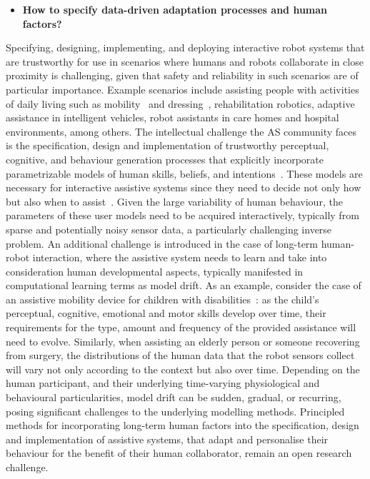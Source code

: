\documentclass[sigconf,nonacm]{acmart}%
\begin{document}
	\begin{itemize}[leftmargin=0.5cm]
		\item \textbf{How to specify data-driven adaptation processes and human factors?}
	\end{itemize}
	Specifying, designing, implementing, and deploying interactive robot systems that are trustworthy for use in scenarios where humans and robots collaborate in close proximity is challenging, given that safety and reliability in such scenarios are of particular importance. Example scenarios include assisting people with activities of daily living such as mobility~\cite{SohDemiris2015} and dressing~\cite{GaoEtAl2020}, rehabilitation robotics, adaptive assistance in intelligent vehicles, robot assistants in care homes and hospital environments, among others. The intellectual challenge the AS community faces is the specification, design and implementation of trustworthy perceptual, cognitive, and behaviour generation processes that explicitly incorporate parametrizable models of human skills, beliefs, and intentions~\cite{Demiris2007}. 
	These models are necessary for interactive assistive systems since they need to decide not only how but also when to assist~\cite{GeorgiouDemiris}. Given the large variability of human behaviour, the parameters of these user models need to be acquired interactively, typically from sparse and potentially noisy sensor data, a particularly challenging inverse problem. An additional challenge is introduced in the case of long-term human-robot interaction, where the assistive system needs to learn and take into consideration human developmental aspects, typically manifested in computational learning terms as model drift. 
	As an example, consider the case of an assistive mobility device for children with disabilities~\cite{SohDemiris2015}: as the child's perceptual, cognitive, emotional and motor skills develop over time, their requirements for the type, amount and frequency of the provided assistance will need to evolve. Similarly, when assisting an elderly person or someone recovering from surgery, the distributions of the human data that the robot sensors collect will vary not only according to the context but also over time. 
	Depending on the human participant, and their underlying time-varying physiological and behavioural particularities, model drift can be sudden, gradual, or recurring, posing significant challenges to the underlying modelling methods. Principled methods for incorporating long-term human factors into the specification, design and implementation of assistive systems, that adapt and personalise their behaviour for the benefit of their human collaborator, remain an open research challenge. 
	
\end{document}
